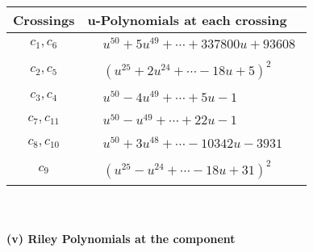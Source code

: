 \documentclass[1p]{elsarticle_modified}
\theoremstyle{definition}
\begin{document}
\begin{tabular}{m{50pt}|m{274pt}}
Crossings & \hspace{64pt}u-Polynomials at each crossing \\
\hline $$\begin{aligned}c_{1},c_{6}\end{aligned}$$&$\begin{aligned}
&u^{50}+5 u^{49}+\cdots+337800 u+93608
\end{aligned}$\\
\hline $$\begin{aligned}c_{2},c_{5}\end{aligned}$$&$\begin{aligned}
&(u^{25}+2 u^{24}+\cdots-18 u+5)^{2}
\end{aligned}$\\
\hline $$\begin{aligned}c_{3},c_{4}\end{aligned}$$&$\begin{aligned}
&u^{50}-4 u^{49}+\cdots+5 u-1
\end{aligned}$\\
\hline $$\begin{aligned}c_{7},c_{11}\end{aligned}$$&$\begin{aligned}
&u^{50}- u^{49}+\cdots+22 u-1
\end{aligned}$\\
\hline $$\begin{aligned}c_{8},c_{10}\end{aligned}$$&$\begin{aligned}
&u^{50}+3 u^{48}+\cdots-10342 u-3931
\end{aligned}$\\
\hline $$\begin{aligned}c_{9}\end{aligned}$$&$\begin{aligned}
&(u^{25}- u^{24}+\cdots-18 u+31)^{2}
\end{aligned}$\\
\hline
\end{tabular}\\~\\
\newpage\renewcommand{\arraystretch}{1}
\flushleft \textbf{(v) Riley Polynomials at the component}\newline \\
\end{document}
